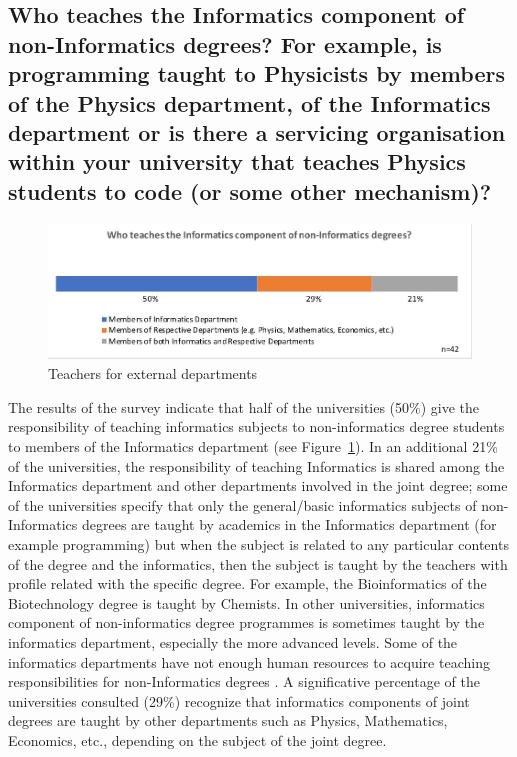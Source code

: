 \subsection{Who teaches the Informatics component of non-Informatics degrees? For example, is programming taught to Physicists by members of the Physics department, of the Informatics department or is there a servicing organisation within your university that teaches Physics students to code (or some other mechanism)? }

\begin{figure}[h]
\includegraphics[width = \linewidth]{charts/2c.jpg}
\caption{Teachers for external departments}
\label{sect3:teachers}
\end{figure}

The results of the survey indicate that half of the universities (50\%) give the responsibility of teaching informatics subjects to non-informatics degree students to members of the Informatics department (see Figure~\ref{sect3:teachers}). In an additional 21\% of the universities, the responsibility of teaching Informatics is shared among the Informatics department and other departments involved in the joint degree; some of the universities specify that only the general/basic informatics subjects of non-Informatics degrees are taught by academics in the Informatics department (for example programming) but when the subject is related to any particular contents of the degree and the informatics, then the subject is taught by the teachers with profile related with the specific degree. For example, the Bioinformatics of the Biotechnology degree is taught by Chemists. In other universities, informatics component of non-informatics degree programmes is sometimes taught by the informatics department, especially the more advanced levels. Some of the informatics departments have not enough human resources to acquire teaching responsibilities  for non-Informatics degrees . A significative percentage of the universities consulted (29\%) recognize that informatics components of joint degrees are taught by other departments such as Physics, Mathematics, Economics, etc., depending on the subject of the joint degree.

